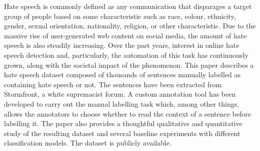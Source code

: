 Hate speech is commonly defined as any communication that disparages a target group of people based on some characteristic such as race, colour, ethnicity, gender, sexual orientation, nationality, religion, or other characteristic. Due to the massive rise of user-generated web content on social media, the amount of hate speech is also steadily increasing. Over the past years, interest in online hate speech detection and, particularly, the automation of this task has continuously grown, along with the societal impact of the phenomenon. This paper describes a hate speech dataset composed of thousands of sentences manually labelled as containing hate speech or not. The sentences have been extracted from Stormfront, a white supremacist forum. A custom annotation tool has been developed to carry out the manual labelling task which, among other things, allows the annotators to choose whether to read the context of a sentence before labelling it. The paper also provides a thoughtful qualitative and quantitative study of the resulting dataset and several baseline experiments with different classification models. The dataset is publicly available.
